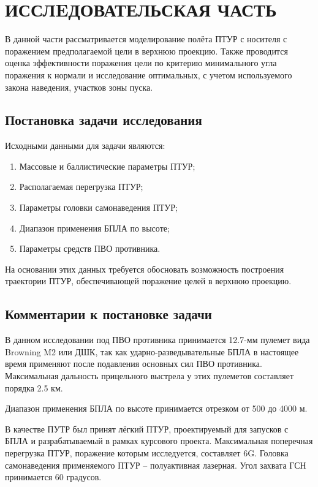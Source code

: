 \chapter{ИССЛEДОВАТЕЛЬСКАЯ ЧАСТЬ}
\label{cha:ch_2}

В данной части рассматривается моделирование полёта ПТУР с носителя с поражением предполагаемой цели в верхнюю проекцию. Также проводится оценка эффективности поражения цели по критерию минимального угла поражения к нормали и исследование оптимальных, с учетом используемого закона наведения, участков зоны пуска.

\section{Постановка задачи исследования}
Исходными данными для задачи являются:

\begin{enumerate}[1.]
	\item Массовые и баллистические параметры ПТУР;
	\item Располагаемая перегрузка ПТУР;
	\item Параметры головки самонаведения ПТУР;
	\item Диапазон применения БПЛА по высоте;
	\item Параметры средств ПВО противника.
\end{enumerate}

На основании этих данных требуется обосновать возможность построения траектории ПТУР, обеспечивающей поражение целей в верхнюю проекцию.

\section{Комментарии к постановке задачи}
В данном исследовании под ПВО противника принимается 12.7-мм пулемет вида Browning M2 или ДШК, так как ударно-разведывательные БПЛА в настоящее время применяют после подавления основных сил ПВО противника. Максимальная дальность прицельного выстрела у этих пулеметов составляет порядка 2.5 км.

Диапазон применения БПЛА по высоте принимается отрезком от 500 до 4000 м.

В качестве ПУТР был принят лёгкий ПТУР, проектируемый для запусков с БПЛА и разрабатываемый в рамках курсового проекта. Максимальная поперечная перегрузка ПТУР, поражение которым исследуется, составляет 6G. Головка самонаведения применяемого ПТУР – полуактивная лазерная. Угол захвата ГСН принимается 60 градусов.

